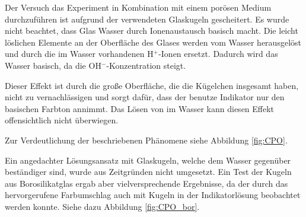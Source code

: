 

Der Versuch das \COT Experiment in Kombination mit einem porösen Medium durchzuführen ist aufgrund der verwendeten Glaskugeln gescheitert. Es wurde nicht beachtet, dass Glas Wasser durch Ionenaustausch basisch macht. Die leicht löslichen Elemente an der Oberfläche des Glases werden vom Wasser herausgelöst und durch die im Wasser vorhandenen H$^+$-Ionen ersetzt. Dadurch wird das Wasser basisch, da die OH$^-$-Konzentration steigt. \citep{Vogel}

Dieser Effekt ist durch die große Oberfläche, die die Kügelchen insgesamt haben, nicht zu vernachlässigen und sorgt dafür, dass der benutze Indikator nur den basischen Farbton annimmt. Das Lösen von \COT im Wasser kann diesen Effekt offensichtlich nicht überwiegen.

Zur Verdeutlichung der beschriebenen Phänomene siehe Abbildung \ref{fig:CPO}.

Ein angedachter Lösungsansatz mit Glaskugeln, welche dem Wasser gegenüber beständiger sind, wurde aus Zeitgründen nicht umgesetzt. Ein Test der Kugeln aus Borosilikatglas ergab aber vielversprechende Ergebnisse, da der durch das \COT hervorgerufene Farbumschlag auch mit Kugeln in der Indikatorlösung beobachtet werden konnte. Siehe dazu Abbildung \ref{fig:CPO_bor}.




  

